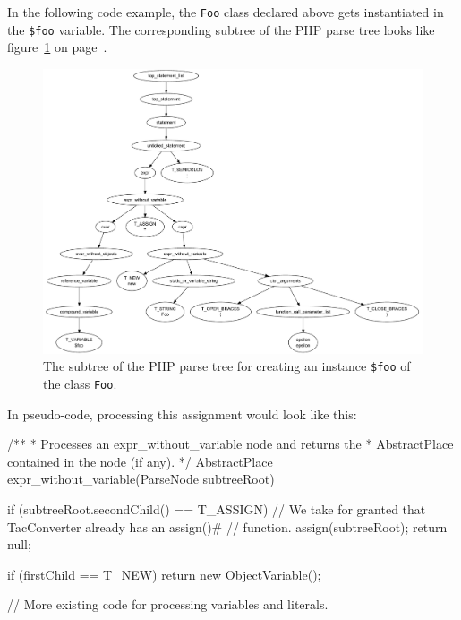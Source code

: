 In the following code example, the \texttt{Foo} class declared above gets instantiated in the \texttt{\$foo} variable. The corresponding subtree of the PHP parse tree looks like figure~\ref{fig:parse-tree-new-foo} on page~\pageref{fig:parse-tree-new-foo}.


\begin{figure}[htb]
  \begin{center}
    \includegraphics[width=\linewidth, height=.9\textheight, keepaspectratio]{images/parsetree-new-foo}
    \caption{The subtree of the PHP parse tree for creating an instance \texttt{\$foo} of the class \texttt{Foo}.}
    \label{fig:parse-tree-new-foo}
  \end{center}
\end{figure}

In pseudo-code, processing this assignment would look like this:

\begin{javacode}
/**
 * Processes an expr_without_variable node and returns the
 * AbstractPlace contained in the node (if any).
 */
AbstractPlace expr_without_variable(ParseNode subtreeRoot) {
  if (subtreeRoot.secondChild() == T_ASSIGN) {
    // We take for granted that TacConverter already has an assign()#
    // function.
    assign(subtreeRoot);
    return null;
  }

  if (firstChild == T_NEW) {
    return new ObjectVariable();
  }

  // More existing code for processing variables and literals.
}
\end{javacode}

